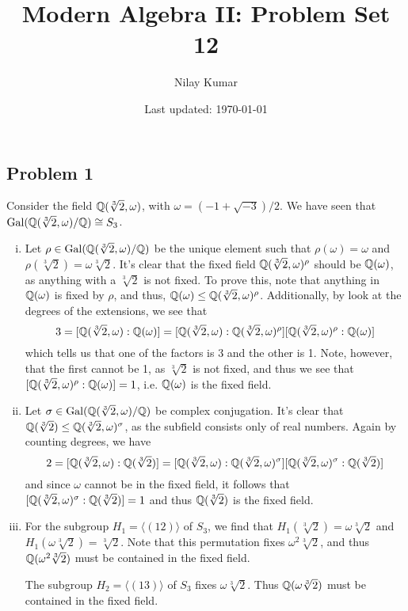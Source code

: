 \documentclass{../../mathnotes}
\title{Modern Algebra II: Problem Set 12}
\author{Nilay Kumar}
\date{Last updated: \today}
\begin{document}
\maketitle

\subsection*{Problem 1}

Consider the field $\mathbb{Q}(\sqrt[3]{2},\omega)$, with $\omega=(-1+\sqrt{-3})/2$. We have
seen that $\operatorname{Gal}(\mathbb{Q}(\sqrt[3]{2},\omega)/\mathbb{Q})\cong S_3$.

\begin{enumerate}[(i)]
    \item Let $\rho\in\operatorname{Gal}(\mathbb{Q}(\sqrt[3]{2},\omega)/\mathbb{Q})$ be the unique element such that
        $\rho(\omega)=\omega$ and $\rho(\sqrt[3]{2})=\omega\sqrt[3]{2}$. It's clear that
        the fixed field $\mathbb{Q}(\sqrt[3]{2},\omega)^\rho$ should be $\mathbb{Q}(\omega)$, as anything
        with a $\sqrt[3]{2}$ is not fixed. To prove this, note that anything in $\mathbb{Q}(\omega)$
        is fixed by $\rho$, and thus, $\mathbb{Q}(\omega)\leq\mathbb{Q}(\sqrt[3]{2},\omega)^\rho$. Additionally,
        by look at the degrees of the extensions, we see that
        \[ 3=[\mathbb{Q}(\sqrt[3]{2},\omega):\mathbb{Q}(\omega)]=[\mathbb{Q}(\sqrt[3]{2},\omega):\mathbb{Q}(\sqrt[3]{2},\omega)^\rho][\mathbb{Q}(\sqrt[3]{2},\omega)^\rho:\mathbb{Q}(\omega)] \]
        which tells us that one of the factors is 3 and the other is 1. Note, however, that
        the first cannot be 1, as $\sqrt[3]{2}$ is not fixed, and thus we see that
        $[\mathbb{Q}(\sqrt[3]{2},\omega)^\rho:\mathbb{Q}(\omega)]=1$, i.e. $\mathbb{Q}(\omega)$ is the fixed field.
    \item Let $\sigma\in\operatorname{Gal}(\mathbb{Q}(\sqrt[3]{2},\omega)/\mathbb{Q})$ be complex conjugation. It's clear that
        $\mathbb{Q}(\sqrt[3]{2})\leq\mathbb{Q}(\sqrt[3]{2},\omega)^\sigma$, as the subfield consists only of real
        numbers. Again by counting degrees, we have
        \[ 2=[\mathbb{Q}(\sqrt[3]{2},\omega):\mathbb{Q}(\sqrt[3]{2})]=[\mathbb{Q}(\sqrt[3]{2},\omega):\mathbb{Q}(\sqrt[3]{2},\omega)^\sigma][\mathbb{Q}(\sqrt[3]{2},\omega)^\sigma:\mathbb{Q}(\sqrt[3]{2})]  \]
        and since $\omega$ cannot be in the fixed field, it follows that $[\mathbb{Q}(\sqrt[3]{2},\omega)^\sigma:\mathbb{Q}(\sqrt[3]{2})]=1$
        and thus $\mathbb{Q}(\sqrt[3]{2})$ is the fixed field.
    \item For the subgroup $H_1=\langle(12)\rangle$ of $S_3$, we find that $H_1(\sqrt[3]{2})=\omega\sqrt[3]{2}$
        and $H_1(\omega\sqrt[3]{2})=\sqrt[3]{2}$. Note that this permutation fixes $\omega^2\sqrt[3]{2}$,
        and thus $\mathbb{Q}(\omega^2\sqrt[3]{2})$ must be contained in the fixed field.

        The subgroup $H_2=\langle(13)\rangle$ of $S_3$ fixes $\omega\sqrt[3]{2}$. Thus $\mathbb{Q}(\omega\sqrt[3]{2})$
        must be contained in the fixed field. 
\end{enumerate}
\end{document}
